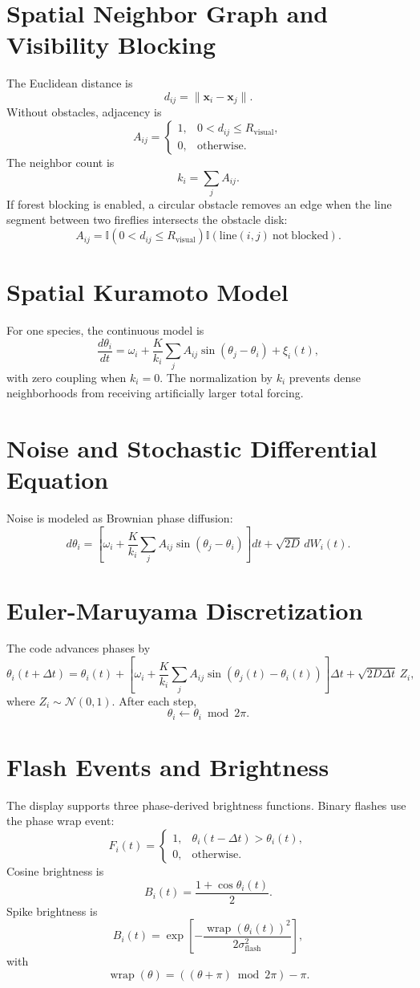 \documentclass[11pt]{article}
\begin{document}
\section{Spatial Neighbor Graph and Visibility Blocking}
The Euclidean distance is
\[
d_{ij}=\|\mathbf{x}_i-\mathbf{x}_j\|.
\]
Without obstacles, adjacency is
\[
A_{ij}=
\begin{cases}
1,&0<d_{ij}\le R_{\mathrm{visual}},\\
0,&\text{otherwise}.
\end{cases}
\]
The neighbor count is
\[
k_i=\sum_j A_{ij}.
\]
If forest blocking is enabled, a circular obstacle removes an edge when the line segment between two fireflies intersects the obstacle disk:
\[
A_{ij}=\mathbb{I}(0<d_{ij}\le R_{\mathrm{visual}})
\mathbb{I}(\mathrm{line}(i,j)\ \mathrm{not\ blocked}).
\]

\section{Spatial Kuramoto Model}
For one species, the continuous model is
\[
\frac{d\theta_i}{dt}=
\omega_i+
\frac{K}{k_i}\sum_j A_{ij}\sin(\theta_j-\theta_i)+\xi_i(t),
\]
with zero coupling when $k_i=0$. The normalization by $k_i$ prevents dense neighborhoods from receiving artificially larger total forcing.

\section{Noise and Stochastic Differential Equation}
Noise is modeled as Brownian phase diffusion:
\[
d\theta_i=
\left[\omega_i+\frac{K}{k_i}\sum_j A_{ij}\sin(\theta_j-\theta_i)\right]dt
+\sqrt{2D}\,dW_i(t).
\]

\section{Euler-Maruyama Discretization}
The code advances phases by
\[
\theta_i(t+\Delta t)=
\theta_i(t)+
\left[\omega_i+\frac{K}{k_i}\sum_j A_{ij}\sin(\theta_j(t)-\theta_i(t))\right]\Delta t
+\sqrt{2D\Delta t}\,Z_i,
\]
where $Z_i\sim\mathcal{N}(0,1)$. After each step,
\[
\theta_i\leftarrow \theta_i\bmod 2\pi.
\]

\section{Flash Events and Brightness}
The display supports three phase-derived brightness functions. Binary flashes use the phase wrap event:
\[
F_i(t)=
\begin{cases}
1,&\theta_i(t-\Delta t)>\theta_i(t),\\
0,&\text{otherwise}.
\end{cases}
\]
Cosine brightness is
\[
B_i(t)=\frac{1+\cos\theta_i(t)}{2}.
\]
Spike brightness is
\[
B_i(t)=\exp\left[-\frac{\operatorname{wrap}(\theta_i(t))^2}{2\sigma_{\mathrm{flash}}^2}\right],
\]
with
\[
\operatorname{wrap}(\theta)=((\theta+\pi)\bmod 2\pi)-\pi.
\]
\end{document}
